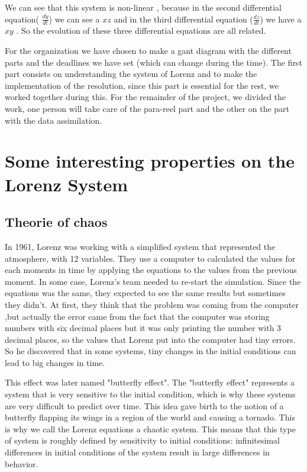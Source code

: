 \documentclass[12pt]{article}
\begin{document}
   \noindent We can see that this system is non-linear , because in the second differential equation( $\frac{dy}{dt}$) we can see a $xz$ and in the third differential equation ($\frac{dz}{dt}$) we have a $xy$ . So the evolution of these three differential equations are all related.
   
   \noindent For the organization we have chosen to make a gant diagram with the different parts and the deadlines we have set (which can change during the time). The first part consists on understanding the system of Lorenz and to make the implementation of the resolution, since this part is essential for the rest, we worked together during this. For the remainder of the project, we divided the work, one person will take care of the para-reel part and the other on the part with the data assimilation.



	
	
	\section{Some interesting properties on the Lorenz System}
	\subsection{Theorie of chaos}
	In 1961, Lorenz was working with a simplified system that represented the atmosphere, with 12 variables. 
    They use a computer to calculated the values for each moments in time by applying the equations to the values from the previous moment. In some case, Lorenz’s team needed to re-start the simulation. Since the equations was the same, they expected to see the same results but sometimes they didn’t. At first, they think that the problem was coming from the computer ,but actually the error came from the fact that the computer was storing numbers with six decimal places but it was only printing the number with 3 decimal places, so the values that Lorenz put into the computer had tiny errors. So he discovered that in some systems, tiny changes in the initial conditions can lead to big changes in time.
    
	\noindent This effect was later named "butterfly effect". The "butterfly effect" represents a system that is very sensitive to the initial condition, which is why these systems are very difficult to predict over time. This idea gave birth to the notion of a butterfly flapping its wings in a region of the world and causing a tornado.
    This is why we call the Lorenz equations a chaotic system. This means that this type of system is roughly defined by sensitivity to initial conditions: infinitesimal differences in initial conditions of the system result in large differences in behavior.
\end{document}
